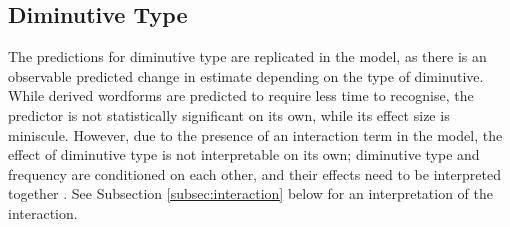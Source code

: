 \begin{table}[h]
\centering
\label{tab:regressionrt}
\caption{Summary of fixed effects.}
\end{table}

\subsection{Diminutive Type} \label{subsec:dimtype}
The predictions for diminutive type are replicated in the model, as there is an observable predicted change in estimate depending on the type of diminutive. While derived wordforms are predicted to require less time to recognise, the predictor is not statistically significant on its own, while its effect size is miniscule. However, due to the presence of an interaction term in the model, the effect of diminutive type is not interpretable on its own; diminutive type and frequency are conditioned on each other, and their effects need to be interpreted together \parencite{Winter+2019}. See Subsection \ref{subsec:interaction} below for an interpretation of the interaction.
